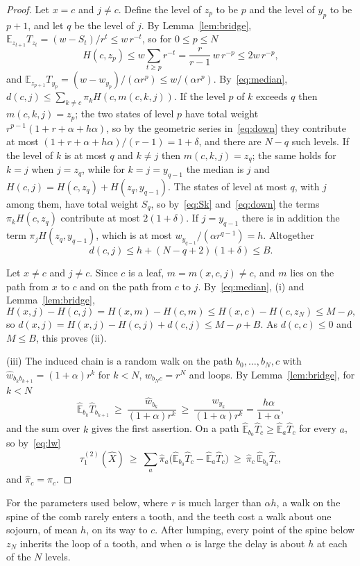 \documentclass[11pt]{amsart}
\theoremstyle{definition}
\newcommand{\E}{\mathbb{E}}
\newcommand{\tmix}{\tau_1^{(2)}}
\newcommand{\hE}{\widehat{\E}}
\newcommand{\hw}{\widehat{w}}
\newcommand{\hpi}{\widehat{\pi}}
\newcommand{\hX}{\widehat{X}}
\begin{document}
\begin{proof}
Let $x=c$ and $j\ne c$. Define the level of $z_p$ to be $p$ and the level of $y_p$ to be $p+1$, and let $q$ be the
level of $j$. By Lemma~\ref{lem:bridge}, $\E_{z_{t+1}}T_{z_t}=(w-S_t)/r^t\le w\,r^{-t}$, so for $0\le p\le N$
\begin{equation}\label{eq:down}
H(c,z_p)\le w\sum_{t\ge p}r^{-t}=\frac{r}{r-1}\,w\,r^{-p}\le 2w\,r^{-p},
\end{equation}
and $\E_{z_{p+1}}T_{y_p}=(w-w_{y_p})/(\alpha r^p)\le w/(\alpha r^p)$. By~\eqref{eq:median},
$d(c,j)\le\sum_{k\ne c}\pi_kH(c,m(c,k,j))$. If the level $p$ of $k$ exceeds $q$ then $m(c,k,j)=z_p$; the two states
of level $p$ have total weight $r^{p-1}(1+r+\alpha+h\alpha)$, so by the geometric series in~\eqref{eq:down} they
contribute at most $(1+r+\alpha+h\alpha)/(r-1)=1+\delta$, and there are $N-q$ such levels. If the level of $k$ is at
most $q$ and $k\ne j$ then $m(c,k,j)=z_q$; the same holds for $k=j$ when $j=z_q$, while for $k=j=y_{q-1}$ the median
is $j$ and $H(c,j)=H(c,z_q)+H(z_q,y_{q-1})$. The states of level at most $q$, with $j$ among them, have total weight
$S_q$, so by~\eqref{eq:Sk} and~\eqref{eq:down} the terms $\pi_kH(c,z_q)$ contribute at most $2(1+\delta)$. If
$j=y_{q-1}$ there is in addition the term $\pi_jH(z_q,y_{q-1})$, which is at most $w_{y_{q-1}}/(\alpha r^{q-1})=h$.
Altogether
\[
d(c,j)\le h+(N-q+2)(1+\delta)\le B .
\]

Let $x\ne c$ and $j\ne c$. Since $c$ is a leaf, $m=m(x,c,j)\ne c$, and $m$ lies on the path from $x$ to $c$ and on the
path from $c$ to $j$. By~\eqref{eq:median}, (i) and Lemma~\ref{lem:bridge},
\[
H(x,j)-H(c,j)=H(x,m)-H(c,m)\le H(x,c)-H(c,z_N)\le M-\rho ,
\]
so $d(x,j)=H(x,j)-H(c,j)+d(c,j)\le M-\rho+B$. As $d(c,c)\le0$ and $M\le B$, this proves (ii).

(iii) The induced chain is a random walk on the path $b_0,\dots,b_N,c$ with $\hw_{b_kb_{k+1}}=(1+\alpha)r^k$ for
$k<N$, $\hw_{b_Nc}=r^N$ and loops. By Lemma~\ref{lem:bridge}, for $k<N$
\[
\hE_{b_k}\widehat{T}_{b_{k+1}}\ \ge\ \frac{\hw_{b_k}}{(1+\alpha)r^k}\ \ge\ \frac{w_{y_k}}{(1+\alpha)r^k}
=\frac{h\alpha}{1+\alpha},
\]
and the sum over $k$ gives the first assertion. On a path $\hE_{b_0}\widehat{T}_c\ge\hE_a\widehat{T}_c$ for every
$a$, so by~\eqref{eq:lw}
\[
\tmix(\hX)\ \ge\ \sum_a\hpi_a\bigl(\hE_{b_0}\widehat{T}_c-\hE_a\widehat{T}_c\bigr)\ \ge\ \hpi_c\,\hE_{b_0}\widehat{T}_c ,
\]
and $\hpi_c=\pi_c$.
\end{proof}

For the parameters used below, where $r$ is much larger than $\alpha h$, a walk on the spine of the comb rarely
enters a tooth, and the teeth cost a walk about one sojourn, of mean $h$, on its way to $c$. After lumping, every
point of the spine below $z_N$ inherits the loop of a tooth, and when $\alpha$ is large the delay is about $h$ at
each of the $N$ levels.
\end{document}
